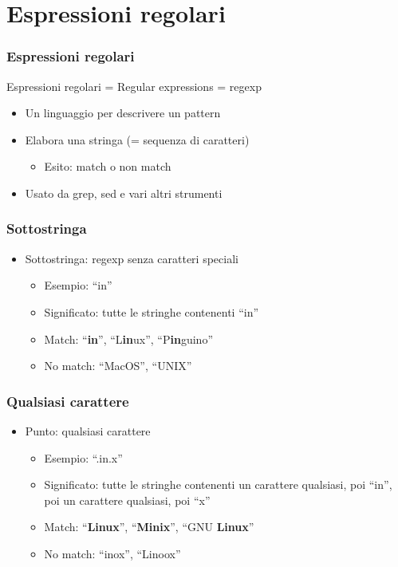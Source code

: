 \documentclass[xetex,table]{beamer}
\begin{document}
\section{Espressioni regolari}

\begin{frame}
  \frametitle{Espressioni regolari}
  Espressioni regolari = Regular expressions = regexp
  \begin{itemize}
  \item Un linguaggio per descrivere un pattern
  \item Elabora una stringa (= sequenza di caratteri)
    \begin{itemize}
    \item Esito: match o non match
    \end{itemize}
  \item Usato da grep, sed e vari altri strumenti
  \end{itemize}
\end{frame}

\begin{frame}
  \frametitle{Sottostringa}
  \begin{itemize}
  \item Sottostringa: regexp senza caratteri speciali
    \begin{itemize}
    \item Esempio: ``in''
    \item Significato: tutte le stringhe contenenti ``in''
    \item Match: ``{\bf in}'', ``L{\bf in}ux'', ``P{\bf in}guino''
    \item No match: ``MacOS'', ``UNIX''
    \end{itemize}
  \end{itemize}
\end{frame}

\begin{frame}
  \frametitle{Qualsiasi carattere}
  \begin{itemize}
  \item Punto: qualsiasi carattere
    \begin{itemize}
    \item Esempio: ``.in.x''
    \item Significato: tutte le stringhe contenenti un carattere
      qualsiasi, poi ``in'', poi un carattere qualsiasi, poi ``x''
    \item Match: ``{\bf Linux}'', ``{\bf Minix}'', ``GNU {\bf Linux}''
    \item No match: ``inox'', ``Linoox''
    \end{itemize}
  \end{itemize}
\end{frame}
\end{document}
